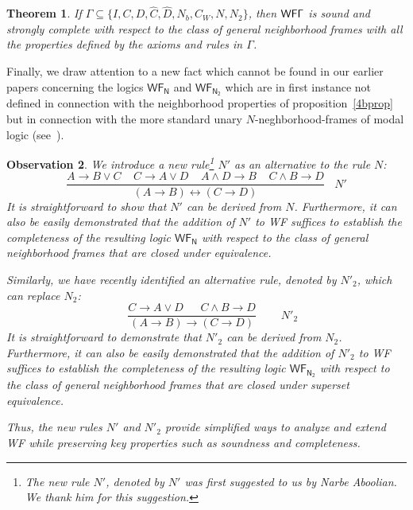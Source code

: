 \documentclass[12pt]{article}
\newtheorem{thm}{Theorem}[section]
\newtheorem{obs}[thm]{Observation}
\begin{document}
\begin{thm}\label{4b}
If $ \Gamma\subseteq\lbrace  I,  C, D, \widehat{C}, \widehat{D}, N_{b}, C_{W}, N, N_{2} \rbrace $, then  ${\sf WF\Gamma }$ is sound and strongly complete
with respect to the class of general neighborhood frames with all the
properties defined by the axioms and rules in $ \Gamma $.
\end{thm}
Finally, we draw attention to a new fact which cannot be found in our earlier papers concerning the logics $\mathsf{WF_N}$ and $\mathsf{WF_{N_2}}$ which are in first instance not defined in connection with the neighborhood properties of proposition~\ref{4bprop} but in connection with the more standard unary $N$-neghborhood-frames of modal logic (see~\cite{Dic4}).
\begin{obs} We introduce a new rule\footnote{The new rule $ N'$, denoted by $N'$ was first suggested to us by Narbe Aboolian. We thank him for this suggestion.} $N'$ as an alternative to the rule $N$:
$$ \frac{A\rightarrow B\vee C~~~~~C\rightarrow A\vee D~~~~~A\wedge  D\rightarrow B~~~~~ C\wedge B\rightarrow D}{(A\rightarrow B)\leftrightarrow (C\rightarrow D)}~~~~N'$$
It is straightforward to show that $N'$ can be derived from $N$. Furthermore, it can also be easily demonstrated that the addition of $N'$ to {\sf WF} suffices to establish the completeness of the resulting logic $\mathsf{WF_N}$ with respect to the class of general neighborhood frames that are closed under equivalence.

Similarly, we have recently identified an alternative rule, denoted by $ N'_{2} $, which can replace $N_{2} $:
$$~~~~~ \frac{C\rightarrow A\vee D~~~~~~~ C\wedge B\rightarrow D}{(A\rightarrow B)\rightarrow (C\rightarrow D)}~~~~~~~~~~N'_{2}$$
It is straightforward to demonstrate that 
$  N'_{2} $ can be derived from $ N_{2} $. Furthermore, it can also be easily demonstrated that the addition of $ N'_{2} $ to {\sf WF} suffices to establish the completeness of the resulting logic $\mathsf{WF_{N_2}}$ with respect to the class of general neighborhood frames that are closed under superset equivalence.

Thus, the new rules $N'$  and $  N'_{2} $ provide simplified ways to analyze and extend {\sf WF} while preserving key properties such as soundness and completeness.
\end{obs}
\end{document}
